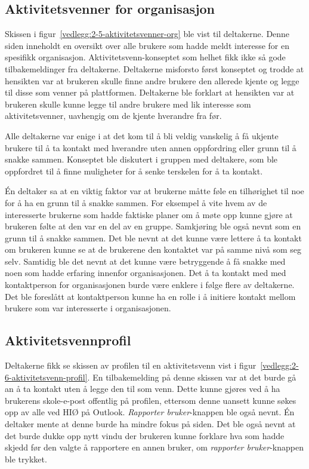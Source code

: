 \subsection{Aktivitetsvenner for organisasjon}

Skissen i figur~\ref{vedlegg:2-5-aktivitetsvenner-org} ble vist til deltakerne. Denne siden inneholdt en oversikt over alle brukere som hadde meldt interesse for en spesifikk organisasjon. Aktivitetsvenn-konseptet som helhet fikk ikke så gode tilbakemeldinger fra deltakerne. Deltakerne misforsto først konseptet og trodde at hensikten var at brukeren skulle finne andre brukere den allerede kjente og legge til disse som venner på plattformen. Deltakerne ble forklart at hensikten var at brukeren skulle kunne legge til andre brukere med lik interesse som aktivitetsvenner, uavhengig om de kjente hverandre fra før. 

Alle deltakerne var enige i at det kom til å bli veldig vanskelig å få ukjente brukere til å ta kontakt med hverandre uten annen oppfordring eller grunn til å snakke sammen. Konseptet ble diskutert i gruppen med deltakere, som ble oppfordret til å finne muligheter for å senke terskelen for å ta kontakt. 

Én deltaker sa at en viktig faktor var at brukerne måtte føle en tilhørighet til noe for å ha en grunn til å snakke sammen. For eksempel å vite hvem av de interesserte brukerne som hadde faktiske planer om å møte opp kunne gjøre at brukeren følte at den var en del av en gruppe. Samkjøring ble også nevnt som en grunn til å snakke sammen. Det ble nevnt at det kunne være lettere å ta kontakt om brukeren kunne se at de brukerene den kontaktet var på samme nivå som seg selv. Samtidig ble det nevnt at det kunne være betryggende å få snakke med noen som hadde erfaring innenfor organisasjonen. Det å ta kontakt med med kontaktperson for organisasjonen burde være enklere i følge flere av deltakerne. Det ble foreslått at kontaktperson kunne ha en rolle i å initiere kontakt mellom brukere som var interesserte i organisasjonen.


\subsection{Aktivitetsvennprofil}

Deltakerne fikk se skissen av profilen til en aktivitetsvenn vist i figur~\ref{vedlegg:2-6-aktivitetsvenn-profil}. En tilbakemelding på denne skissen var at det burde gå an å ta kontakt uten å legge den til som venn. Dette kunne gjøres ved å ha brukerens skole-e-post offentlig på profilen, ettersom denne uansett kunne søkes opp av alle ved HIØ på Outlook. {\em Rapporter bruker}-knappen ble også nevnt. Én deltaker mente at denne burde ha mindre fokus på siden. Det ble også nevnt at det burde dukke opp nytt vindu der brukeren kunne forklare hva som hadde skjedd før den valgte å rapportere en annen bruker, om {\em rapporter bruker}-knappen ble trykket.



